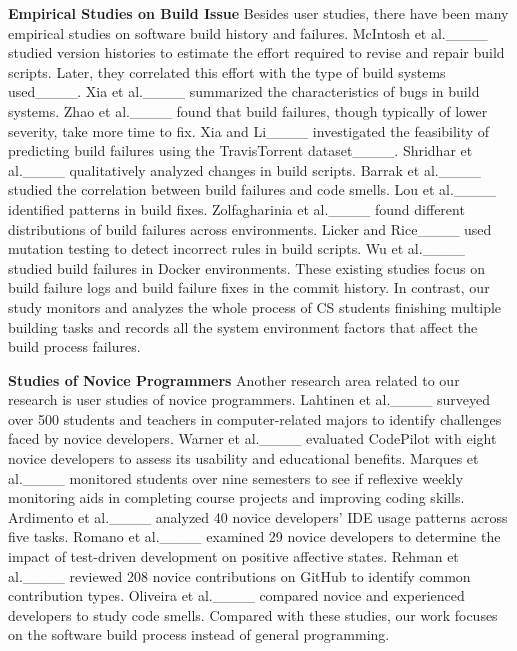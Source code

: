 \textbf{Empirical Studies on Build Issue}
Besides user studies, there have been many empirical studies on software build history and failures. McIntosh et al.____ studied version histories to estimate the effort required to revise and repair build scripts. Later, they correlated this effort with the type of build systems used____. Xia et al.____ summarized the characteristics of bugs in build systems. Zhao et al.____ found that build failures, though typically of lower severity, take more time to fix. Xia and Li____ investigated the feasibility of predicting build failures using the TravisTorrent dataset____. Shridhar et al.____ qualitatively analyzed changes in build scripts. Barrak et al.____ studied the correlation between build failures and code smells. Lou et al.____ identified patterns in build fixes. Zolfagharinia et al.____ found different distributions of build failures across environments. Licker and Rice____ used mutation testing to detect incorrect rules in build scripts. Wu et al.____ studied build failures in Docker environments. 
These existing studies focus on build failure logs and build failure fixes in the commit history. In contrast, our study monitors and analyzes the whole process of CS students finishing multiple building tasks and records all the system environment factors that affect the build process failures.

\textbf{Studies of Novice Programmers}
Another research area related to our research is user studies of novice programmers. 
Lahtinen et al.____ surveyed over 500 students and teachers in computer-related majors to identify challenges faced by novice developers. Warner et al.____ evaluated CodePilot with eight novice developers to assess its usability and educational benefits. Marques et al.____ monitored students over nine semesters to see if reflexive weekly monitoring aids in completing course projects and improving coding skills. Ardimento et al.____ analyzed 40 novice developers' IDE usage patterns across five tasks. Romano et al.____ examined 29 novice developers to determine the impact of test-driven development on positive affective states. Rehman et al.____ reviewed 208 novice contributions on GitHub to identify common contribution types. Oliveira et al.____ compared novice and experienced developers to study code smells.
Compared with these studies, our work focuses on the software build process instead of general programming.